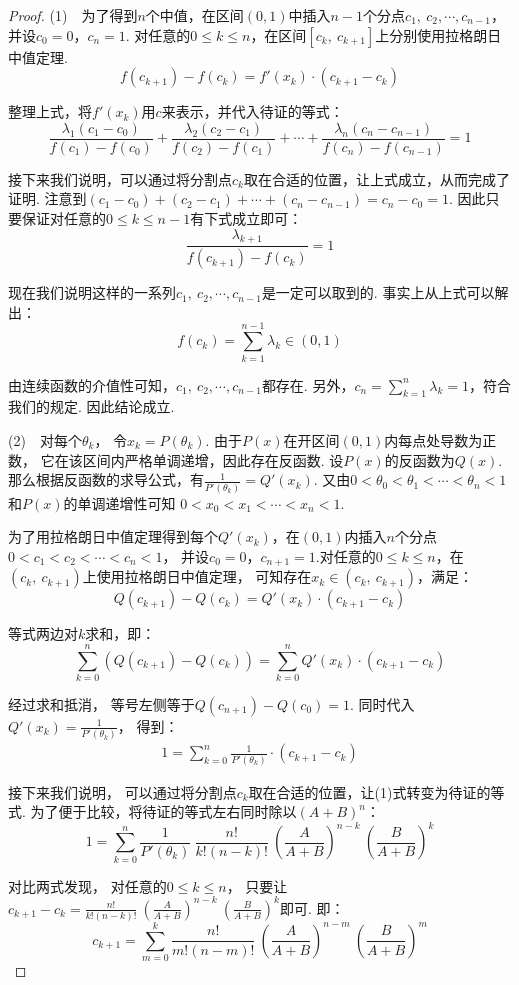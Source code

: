 \begin{proof}
(1)~~为了得到$n$个中值，在区间$(0,1)$中插入$n-1$个分点$c_1,~c_2, \cdots ,c_{n-1}$，
并设$c_0 = 0$，$c_n = 1$.
对任意的$0 \le k \le n$，在区间$[c_k,~c_{k+1}]$上分别使用拉格朗日中值定理.
$$
f(c_{k+1}) - f(c_k) = f'(x_k) \cdot (c_{k+1} - c_{k})
$$\par
整理上式，将$f'(x_k)$用$c$来表示，并代入待证的等式：
$$
\frac{\lambda_1 (c_1 - c_0)}{f(c_1) - f(c_0)} +
 \frac{\lambda_2(c_2 - c_1)}{f(c_2) - f(c_1)} +
 \cdots +
 \frac{\lambda_n(c_n - c_{n-1})}{f(c_n) - f(c_{n-1})} = 1
$$\par
接下来我们说明，可以通过将分割点$c_k$取在合适的位置，让上式成立，从而完成了证明.
注意到$(c_1 - c_0) + (c_2 - c_1) + \cdots + (c_n - c_{n-1}) = c_n - c_0 = 1$.
因此只要保证对任意的$0 \le k \le n-1$有下式成立即可：
$$
\frac{\lambda_{k+1}}{f(c_{k+1}) - f(c_k)} = 1
$$ \par
现在我们说明这样的一系列$c_1,~c_2, \cdots ,c_{n-1}$是一定可以取到的.
事实上从上式可以解出：
$$
f(c_k) = \sum_{k=1}^{n-1} \lambda_k \in (0,1)
$$\par
由连续函数的介值性可知，$c_1,~c_2, \cdots ,c_{n-1}$都存在.
另外，$c_n = \sum_{k=1}^{n} \lambda_k = 1$，符合我们的规定.
因此结论成立.

(2)~~对每个$\theta_k$，
令$x_k = P(\theta_k)$.
由于$P(x)$在开区间$(0,1)$内每点处导数为正数，
它在该区间内严格单调递增，因此存在反函数.
设$P(x)$的反函数为$Q(x)$.
那么根据反函数的求导公式，有$\frac{1}{P'(\theta_k)} = Q'(x_k)$.
又由$0 < \theta_0 < \theta_1 < \cdots < \theta_n < 1$和$P(x)$的单调递增性可知
$0 < x_0 < x_1 < \cdots < x_n < 1$. \par
为了用拉格朗日中值定理得到每个$Q'(x_k)$，在$(0,1)$内插入$n$个分点$0<c_1<c_2< \cdots < c_n<1$，
并设$c_0 = 0$，$c_{n+1} = 1$.对任意的$0 \le k \le n$，在$(c_{k},~c_{k+1})$上使用拉格朗日中值定理，
可知存在$x_k \in (c_{k},~c_{k+1})$，满足：
$$
Q(c_{k+1}) - Q(c_k) = Q'(x_k) \cdot (c_{k+1} - c_{k})
$$\par
等式两边对$k$求和，即：
$$
\sum_{k=0}^{n} \left(Q(c_{k+1}) - Q(c_k)\right) =\sum_{k=0}^{n} Q'(x_k) \cdot (c_{k+1} - c_{k})
$$

经过求和抵消，
等号左侧等于$Q(c_{n+1}) - Q(c_0) = 1$.
同时代入$Q'(x_k) = \frac{1}{P'(\theta_k)}$，
得到：
\begin{equation}
    \begin{aligned}
        1 = \sum_{k=0}^{n} \frac{1}{P'(\theta_k)} \cdot (c_{k+1} - c_{k})
    \end{aligned}
\end{equation}\par
接下来我们说明，
可以通过将分割点$c_k$取在合适的位置，让(1)式转变为待证的等式.
为了便于比较，将待证的等式左右同时除以$(A+B)^n$：
$$
1 = \sum_{k=0}^{n} \frac{1}{P'(\theta_k)} ~\frac{n!}{k!(n-k)!} ~\left(\frac{A}{A+B}\right)^{n-k} ~\left(\frac{B}{A+B}\right)^k
$$\par
对比两式发现，
对任意的$0 \le k \le n$，
只要让$c_{k+1}-c_{k} = \frac{n!}{k!(n-k)!} ~\left(\frac{A}{A+B}\right)^{n-k} ~\left(\frac{B}{A+B}\right)^k$即可.
即：
$$
c_{k+1} = \sum_{m=0}^{k} \frac{n!}{m!(n-m)!} ~\left(\frac{A}{A+B}\right)^{n-m} ~\left(\frac{B}{A+B}\right)^m
$$


\end{proof}
